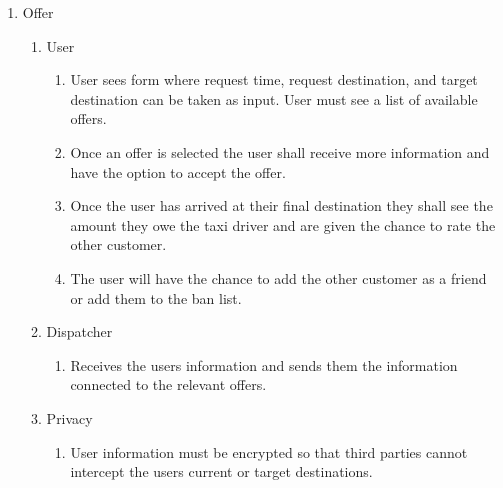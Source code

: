 \documentclass[english]{article}
\begin{document}
\begin{enumerate}[{BE}1.]
	\item Offer		
	\begin{enumerate}[{VP5}.1]
		\item User
			\begin{enumerate}
				\item User sees form where request time, request destination, and target destination can be taken as input. User must see a list of available offers. 
				\item Once an offer is selected the user shall receive more information and have the option to accept the offer. 
				\item Once the user has arrived at their final destination they shall see the amount they owe the taxi driver and are given the chance to rate the other customer. 
				\item The user will have the chance to add the other customer as a friend or add them to the ban list.
			\end{enumerate}
		\item Dispatcher
			\begin{enumerate}
				\item Receives the users information and sends them the information connected to the relevant offers.
			\end{enumerate}
		\item Privacy
			\begin{enumerate}
				\item User information must be encrypted so that third parties cannot intercept the users current or target destinations.
			\end{enumerate}
	\end{enumerate}


\end{enumerate}
\end{document}

